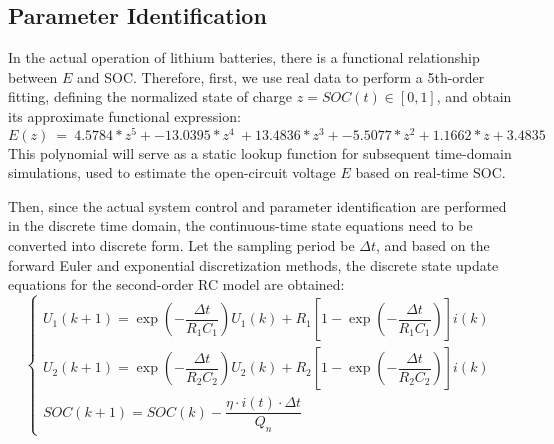 \documentclass{mcmthesis}
\begin{document}
\subsection{Parameter Identification}
In the actual operation of lithium batteries, there is a functional relationship between $E$ and SOC. Therefore,
first, we use real data to perform a 5th-order fitting, defining the normalized state of charge $z=SOC(t)\in [0,1]$, and obtain its approximate functional expression:
\begin{equation}
  E(z)\ =\ 4.5784\ast z^5+-13.0395\ast z^4\ +13.4836\ast z^3+-5.5077\ast z^2+1.1662\ast z+3.4835
\end{equation}
This polynomial will serve as a static lookup function for subsequent time-domain simulations, used to estimate the open-circuit voltage $E$ based on real-time SOC.

Then, since the actual system control and parameter identification are performed in the discrete time domain,
the continuous-time state equations need to be converted into discrete form.
Let the sampling period be $\Delta t$, and based on the forward Euler and exponential discretization methods, the discrete state update equations for the second-order RC model are obtained:
\begin{equation}
\begin{cases}
U_1(k+1) = \exp\left(-\dfrac{\Delta t}{R_1 C_1}\right) U_1(k) + R_1\left[1 - \exp\left(-\dfrac{\Delta t}{R_1 C_1}\right)\right]i(k) \\[10pt]
U_2(k+1) = \exp\left(-\dfrac{\Delta t}{R_2 C_2}\right) U_2(k) + R_2\left[1 - \exp\left(-\dfrac{\Delta t}{R_2 C_2}\right)\right]i(k) \\[10pt]
SOC(k+1) = SOC(k) - \dfrac{\eta \cdot i(t) \cdot \Delta t}{Q_n}
\end{cases}
\label{eq:discrete}
\end{equation}
\end{document}
